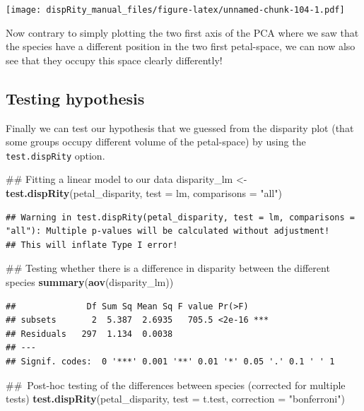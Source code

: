 \documentclass[]{book}
\newenvironment{Shaded}{\begin{snugshade}}{\end{snugshade}}
\newcommand{\KeywordTok}[1]{\textcolor[rgb]{0.13,0.29,0.53}{\textbf{#1}}}
\newcommand{\DataTypeTok}[1]{\textcolor[rgb]{0.13,0.29,0.53}{#1}}
\newcommand{\StringTok}[1]{\textcolor[rgb]{0.31,0.60,0.02}{#1}}
\newcommand{\NormalTok}[1]{#1}
\theoremstyle{definition}
\theoremstyle{definition}
\theoremstyle{remark}
\begin{document}
\texttt{[image: dispRity\_manual\_files/figure-latex/unnamed-chunk-104-1.pdf]}

Now contrary to simply plotting the two first axis of the PCA where we
saw that the species have a different position in the two first
petal-space, we can now also see that they occupy this space clearly
differently!

\subsection{Testing hypothesis}\label{testing-hypothesis}

Finally we can test our hypothesis that we guessed from the disparity
plot (that some groups occupy different volume of the petal-space) by
using the \texttt{test.dispRity} option.

\begin{Shaded}
\begin{Highlighting}[]
\NormalTok{## Fitting a linear model to our data}
\NormalTok{disparity_lm <-}\StringTok{ }\KeywordTok{test.dispRity}\NormalTok{(petal_disparity, }\DataTypeTok{test =}\NormalTok{ lm, }\DataTypeTok{comparisons =} \StringTok{"all"}\NormalTok{)}
\end{Highlighting}
\end{Shaded}

\begin{verbatim}
## Warning in test.dispRity(petal_disparity, test = lm, comparisons = "all"): Multiple p-values will be calculated without adjustment!
## This will inflate Type I error!
\end{verbatim}

\begin{Shaded}
\begin{Highlighting}[]
\NormalTok{## Testing whether there is a difference in disparity between the different species}
\KeywordTok{summary}\NormalTok{(}\KeywordTok{aov}\NormalTok{(disparity_lm))}
\end{Highlighting}
\end{Shaded}

\begin{verbatim}
##              Df Sum Sq Mean Sq F value Pr(>F)    
## subsets       2  5.387  2.6935   705.5 <2e-16 ***
## Residuals   297  1.134  0.0038                   
## ---
## Signif. codes:  0 '***' 0.001 '**' 0.01 '*' 0.05 '.' 0.1 ' ' 1
\end{verbatim}

\begin{Shaded}
\begin{Highlighting}[]
\NormalTok{## Post-hoc testing of the differences between species (corrected for multiple tests)}
\KeywordTok{test.dispRity}\NormalTok{(petal_disparity, }\DataTypeTok{test =}\NormalTok{ t.test, }\DataTypeTok{correction =} \StringTok{"bonferroni"}\NormalTok{)}
\end{Highlighting}
\end{Shaded}
\end{document}
